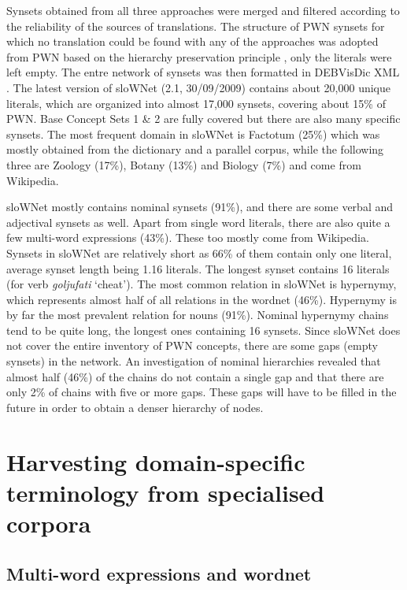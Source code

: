 \documentclass[output=paper]{LSP/langsci}
\begin{document}
Synsets obtained from all three approaches were merged and filtered according to the reliability of the sources of translations. The structure of PWN synsets for which no translation could be found with any of the approaches was adopted from PWN based on the hierarchy preservation principle \citep{Tufis2000}, only the literals were left empty. The entre network of synsets was then formatted in DEBVisDic XML \citep{HorakEtAl2005}. The latest version of sloWNet (2.1, 30/09/2009) contains about 20,000 unique literals, which are organized into almost 17,000 synsets, covering about 15\% of PWN. Base Concept Sets 1 \& 2 are fully covered but there are also many specific synsets. The most frequent domain in sloWNet is Factotum (25\%) which was mostly obtained from the dictionary and a parallel corpus, while the following three are Zoology (17\%), Botany (13\%) and Biology (7\%) and come from Wikipedia.

sloWNet mostly contains nominal synsets (91\%), and there are some verbal and adjectival synsets as well. Apart from single word literals, there are also quite a few multi-word expressions (43\%). These too mostly come from Wikipedia. Synsets in sloWNet are relatively short as 66\% of them contain only one literal, average synset length being 1.16 literals. The longest synset contains 16 literals (for verb \textit{goljufati} `cheat'). The most common relation in sloWNet is hypernymy, which represents almost half of all relations in the wordnet (46\%). Hypernymy is by far the most prevalent relation for nouns (91\%). Nominal hypernymy chains tend to be quite long, the longest ones containing 16 synsets. Since sloWNet does not cover the entire inventory of PWN concepts, there are some gaps (empty synsets) in the network. An investigation of nominal hierarchies revealed that almost half (46\%) of the chains do not contain a single gap and that there are only 2\% of chains with five or more gaps. These gaps will have to be filled in the future in order to obtain a denser hierarchy of nodes.

\section{Harvesting domain-specific terminology from specialised corpora}\label{sec:vintar:3}
\subsection{Multi-word expressions and wordnet}\label{sec:3.1}
\end{document}
